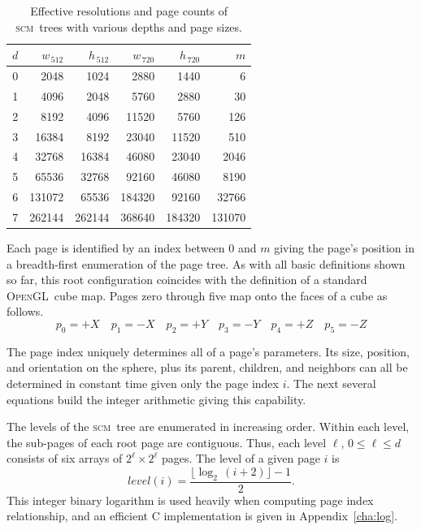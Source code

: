 \documentclass[oneside,10pt]{memoir}
\newcommand{\opengl}  {\textsc{OpenGL}}
\newcommand{\scm}     {\textsc{scm}}
\newcommand{\B}{\bigstrut[b]}
\newcommand{\T}{\bigstrut[t]}
\newcommand{\scmlevel} [1]{\ensuremath{\mathit{level}(#1)}}
\begin{document}
\begin{Spacing}{1.1}
\begin{table}
  \centering
  \label{tab:resolution}
  \begin{tabular}{r|rr|rr|r}
  $d$& $w_{\,512}$& $h_{\,512}$& $w_{\,720}$& $h_{\,720}$& $m$ \B\\\hline
  \num{0}&  \num{2048}&  \num{1024}&  \num{2880}&  \num{1440}&     \num{6} \T\\
  \num{1}&  \num{4096}&  \num{2048}&  \num{5760}&  \num{2880}&    \num{30} \\
  \num{2}&  \num{8192}&  \num{4096}& \num{11520}&  \num{5760}&   \num{126} \\
  \num{3}& \num{16384}&  \num{8192}& \num{23040}& \num{11520}&   \num{510} \\
  \num{4}& \num{32768}& \num{16384}& \num{46080}& \num{23040}&  \num{2046} \\
  \num{5}& \num{65536}& \num{32768}& \num{92160}& \num{46080}&  \num{8190} \\
  \num{6}&\num{131072}& \num{65536}&\num{184320}& \num{92160}& \num{32766} \\
  \num{7}&\num{262144}&\num{262144}&\num{368640}&\num{184320}&\num{131070} \\
  \end{tabular}
  \caption{Effective resolutions and page counts of \scm\ trees with various depths and page sizes.}
\end{table}

Each page is identified by an index between $0$ and $m$ giving the page's position in a breadth-first enumeration of the page tree. As with all basic definitions shown so far, this root configuration coincides with the definition of a standard \opengl\ cube map. Pages zero through five map onto the faces of a cube as follows.
\[p_0=+X\quad p_1=-X\quad p_2=+Y\quad p_3=-Y\quad p_4=+Z\quad p_5=-Z\]

The page index uniquely determines all of a page's parameters. Its size, position, and orientation on the sphere, plus its parent, children, and neighbors can all be determined in constant time given only the page index $i$. The next several equations build the integer arithmetic giving this capability.

The levels of the \scm\ tree are enumerated in increasing order. Within each level, the sub-pages of each root page are contiguous. Thus, each level $\ell$, $0\leq\ell\leq d$ consists of six arrays of $2^\ell\times2^\ell$ pages. The level of a given page $i$ is
\[\scmlevel{i}=\frac{\lfloor\log_2\,(i+2)\rfloor-1}{2}.\]
This integer binary logarithm is used heavily when computing page index relationship, and an efficient C implementation is given in Appendix~\ref{cha:log}.


\end{Spacing}
\end{document}
